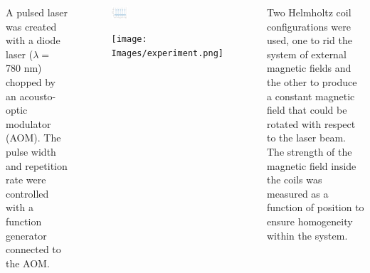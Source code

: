 \documentclass[
30pt,%
a1paper, 
landscape,%
margin = 0mm,
innermargin = -2cm,
colspace = 5mm,
subcolspace = 0mm,
blockverticalspace=.5cm %
]{tikzposter}
\begin{document}
\begin{columns}
		{
			A pulsed laser was created with a diode laser ($\lambda = $ 780 nm) chopped by an acousto-optic modulator (AOM). The pulse width and repetition rate were controlled with a function generator connected to the AOM.
\begin{figure}
	\vspace{-2cm}
		\begin{tikzfigure}[]
			\includegraphics[width=0.15\textwidth]{Images/diodepulse.pdf}
		\end{tikzfigure}
		\begin{tikzfigure}[]
			\texttt{[image: Images/experiment.png]}
		\end{tikzfigure}
	\end{figure}
		
		Two Helmholtz coil configurations were used, one to rid the system of external magnetic fields and the other to produce a constant magnetic field that could be rotated with respect to the laser beam. 
	The strength of the magnetic field inside the coils was measured as a function of position to ensure homogeneity within the system. 
	\vspace{1cm}
	
}
\end{columns}
\end{document}
